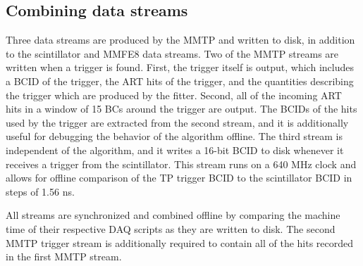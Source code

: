 

\subsection{Combining data streams}
\label{sec:data-streams}

Three data streams are produced by the MMTP and written to disk, in addition to the scintillator and MMFE8 data streams. Two of the MMTP streams are written when a trigger is found. First, the trigger itself is output, which includes a BCID of the trigger, the ART hits of the trigger, and the quantities describing the trigger which are produced by the fitter. Second, all of the incoming ART hits in a window of 15 BCs around the trigger are output. The BCIDs of the hits used by the trigger are extracted from the second stream, and it is additionally useful for debugging the behavior of the algorithm offline. The third stream is independent of the algorithm, and it writes a 16-bit BCID to disk whenever it receives a trigger from the scintillator. This stream runs on a 640 MHz clock and allows for offline comparison of the TP trigger BCID to the scintillator BCID in steps of 1.56 ns.

All streams are synchronized and combined offline by comparing the machine time of their respective DAQ scripts as they are written to disk. The second MMTP trigger stream is additionally required to contain all of the hits recorded in the first MMTP stream.

